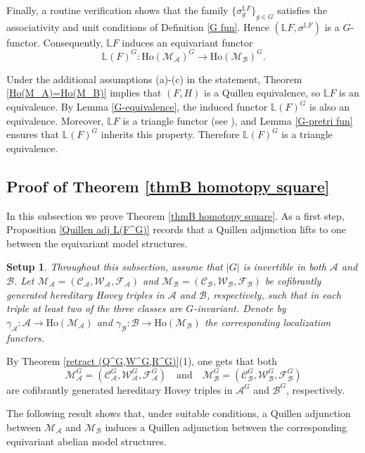 \documentclass[12pt,twoside]{amsart}
\theoremstyle{bfupright head,slanted body}
\theoremstyle{bfupright head,upright body}
\theoremstyle{fixed bf head,slanted body}
\theoremstyle{fixed bf head,upright body}
\newtheorem{setup}[res]{Setup}           \newtheorem*{setup*}{Setup}
\theoremstyle{numbered paragraph}
\newenvironment{prf*}[1][Proof]{%
  \begin{proof}[\bf #1]
    \setcounter{equation}{0}
    \renewcommand{\theequation}{\arabic{equation}}}
  {\end{proof}
}
\newcommand{\thmcite}[2][?]{\cite[Theorem~#1]{#2}}
\numberwithin{equation}{res}
\newcommand{\calC}{\mathcal{C}}
\newcommand{\calW}{\mathcal{W}}
\newcommand{\calF}{\mathcal{F}}
\newcommand{\calA}{\mathcal{A}}
\newcommand{\calB}{\mathcal{B}}
\newcommand{\calM}{\mathcal{M}}
\newcommand{\Ho}{\mathrm{Ho}}
\begin{document}
\begin{prf*}
Finally, a routine verification shows that the family \(\{\sigma_g^{\mathbb{L}F}\}_{g\in G}\) satisfies the associativity and unit conditions of Definition \ref{G fun}. Hence \((\mathbb{L}F,\sigma^{\mathbb{L}F})\) is a \(G\)-functor. Consequently, \(\mathbb{L}F\) induces an equivariant functor
\[
\mathbb{L}(F)^G:\Ho(\calM_\calA)^G\to\Ho(\calM_\calB)^G.
\]

Under the additional assumptions (a)-(c) in the statement, Theorem \ref{Ho(M_A)=Ho(M_B)} implies that \((F,H)\) is a Quillen equivalence, so \(\mathbb{L}F\) is an equivalence.
By Lemma \ref{G-equivalence}, the induced functor $\mathbb{L}(F)^G$ is also an equivalence.
Moreover, \(\mathbb{L}F\) is a triangle functor (see \thmcite[7.12]{2025GillBook}), and Lemma \ref{G-pretri fun} ensures that $\mathbb{L}(F)^G$ inherits this property.
Therefore $\mathbb{L}(F)^G$ is a triangle equivalence.
\end{prf*}

\subsection{Proof of Theorem \ref{thmB homotopy square}} \label{ThmB(2)}
In this subsection we prove Theorem \ref{thmB homotopy square}. As a first step, Proposition \ref{Quillen adj L(F^G)} records that a Quillen adjunction lifts to one between the equivariant model structures.

\begin{setup}
Throughout this subsection, assume that \(|G|\) is invertible in both \(\calA\) and \(\calB\). Let
\(\calM_\calA=(\calC_\calA,\calW_\calA,\calF_\calA)\)
and
\(\calM_\calB=(\calC_\calB,\calW_\calB,\calF_\calB)\)
be cofibrantly generated hereditary Hovey triples in \(\calA\) and \(\calB\), respectively, such that in each triple at least two of the three classes are \(G\)-invariant. Denote by
\(
\gamma_{\calA}:\calA\to\Ho(\calM_\calA)
\) and
\(\gamma_{\calB}:\calB\to\Ho(\calM_\calB)
\)
the corresponding localization functors.
\end{setup}

By Theorem \ref{retract (Q^G,W^G,R^G)}(1), one gets that both
\[
\calM_\calA^G = (\calC_\calA^G, \calW_\calA^G, \calF_\calA^G)
\quad \text{and} \quad
\calM_\calB^G = (\calC_\calB^G, \calW_\calB^G, \calF_\calB^G)
\]
are cofibrantly generated hereditary Hovey triples in $\calA^G$ and $\calB^G$, respectively.

The following result shows that, under suitable conditions, a Quillen adjunction between $\calM_\calA$ and $\calM_\calB$ induces a Quillen adjunction between the corresponding equivariant abelian model structures.
\end{document}

